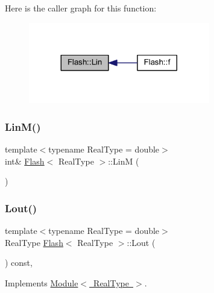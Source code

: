 Here is the caller graph for this function\+:\nopagebreak
\begin{figure}[H]
\begin{center}
\leavevmode
\includegraphics[width=224pt]{class_flash_a074095aaca2230d0bc8d9e5cc513086c_icgraph}
\end{center}
\end{figure}
\mbox{\label{class_flash_a34db5184e457483f86b89cb89e393dc5}} 
\subsubsection{\texorpdfstring{Lin\+M()}{LinM()}}
{\footnotesize\ttfamily template$<$typename Real\+Type = double$>$ \\
int\& \mbox{\hyperlink{class_flash}{Flash}}$<$ Real\+Type $>$\+::LinM (\begin{DoxyParamCaption}{ }\end{DoxyParamCaption})\hspace{0.3cm}{\ttfamily [inline]}}

\mbox{\label{class_flash_a1c6d0596f0a6dbdd7b391ab85772b2d4}} 
\subsubsection{\texorpdfstring{Lout()}{Lout()}}
{\footnotesize\ttfamily template$<$typename Real\+Type = double$>$ \\
Real\+Type \mbox{\hyperlink{class_flash}{Flash}}$<$ Real\+Type $>$\+::Lout (\begin{DoxyParamCaption}{ }\end{DoxyParamCaption}) const\hspace{0.3cm}{\ttfamily [inline]}, {\ttfamily [virtual]}}



Implements \mbox{\hyperlink{class_module_a0258058bfb378f0016b3306dcb8082f3}{Module$<$ Real\+Type $>$}}.

